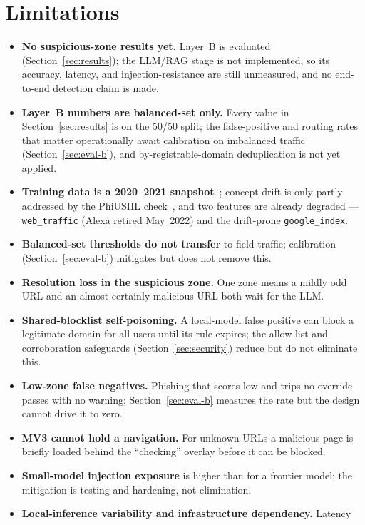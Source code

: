 \documentclass[conference]{IEEEtran}
\begin{document}
\section{Limitations}
\label{sec:lim}
\begin{itemize}
\item \textbf{No suspicious-zone results yet.} Layer~B is evaluated
(Section~\ref{sec:results}); the LLM/RAG stage is not implemented, so its
accuracy, latency, and injection-resistance are still unmeasured, and no
end-to-end detection claim is made.
\item \textbf{Layer~B numbers are balanced-set only.} Every value in
Section~\ref{sec:results} is on the 50/50 split; the false-positive and routing
rates that matter operationally await calibration on imbalanced traffic
(Section~\ref{sec:eval-b}), and by-registrable-domain deduplication is not yet
applied.
\item \textbf{Training data is a 2020--2021 snapshot}~\cite{hannousse2021benchmark};
concept drift is only partly addressed by the PhiUSIIL check~\cite{prasad2024phiusiil},
and two features are already degraded --- \texttt{web\_traffic} (Alexa retired
May~2022) and the drift-prone \texttt{google\_index}.
\item \textbf{Balanced-set thresholds do not transfer} to field traffic;
calibration (Section~\ref{sec:eval-b}) mitigates but does not remove this.
\item \textbf{Resolution loss in the suspicious zone.} One zone means a mildly
odd URL and an almost-certainly-malicious URL both wait for the LLM.
\item \textbf{Shared-blocklist self-poisoning.} A local-model false positive can
block a legitimate domain for all users until its rule expires; the allow-list
and corroboration safeguards (Section~\ref{sec:security}) reduce but do not
eliminate this.
\item \textbf{Low-zone false negatives.} Phishing that scores low and trips no
override passes with no warning; Section~\ref{sec:eval-b} measures the rate but
the design cannot drive it to zero.
\item \textbf{MV3 cannot hold a navigation.} For unknown URLs a malicious page is
briefly loaded behind the ``checking'' overlay before it can be blocked.
\item \textbf{Small-model injection exposure} is higher than for a frontier
model; the mitigation is testing and hardening, not elimination.
\item \textbf{Local-inference variability and infrastructure dependency.} Latency

\end{itemize}
\end{document}
